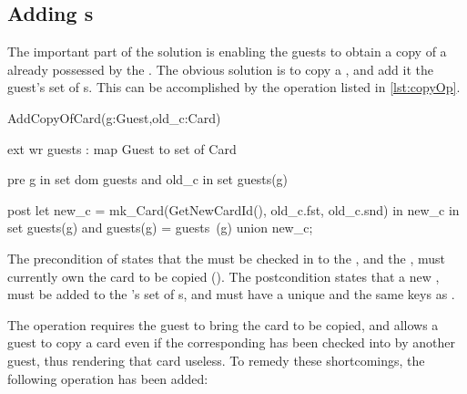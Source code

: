 \documentclass[Main]{subfiles}
\begin{document}
\subsection{Adding s}

The important part of the solution is enabling the guests to obtain a copy of a  already possessed by the . 
The obvious solution is to copy a , and add it the guest's set of s. This can be accomplished by the operation listed in \codeTitle \ref{lst:copyOp}.

\begin{vdmsl}[label=lst:copyOp,caption= Operation \code{AddCopyOfCard()} ]
AddCopyOfCard(g:Guest,old_c:Card)

ext wr guests : map Guest to set of Card 
    
pre g in set dom guests and 
		old_c in set guests(g)	

post let new_c = mk_Card(GetNewCardId(), old_c.fst, old_c.snd) in 
		 new_c in set guests(g) and 
		 guests(g) = guests~(g) union {new_c};
\end{vdmsl}
The precondition of  states that the   must be checked in to the , and the  , must currently own the card to be copied ().
The postcondition states that a new ,  must be added to the 's set of s, and  must have a unique  and the same keys as .

The operation  requires the {guest} to bring the {card} to be copied, and allows a {guest} to copy a {card} even if the corresponding  has been checked into by another {guest}, thus rendering that {card} useless. 
To remedy these shortcomings, the following operation has been added:
\end{document}

